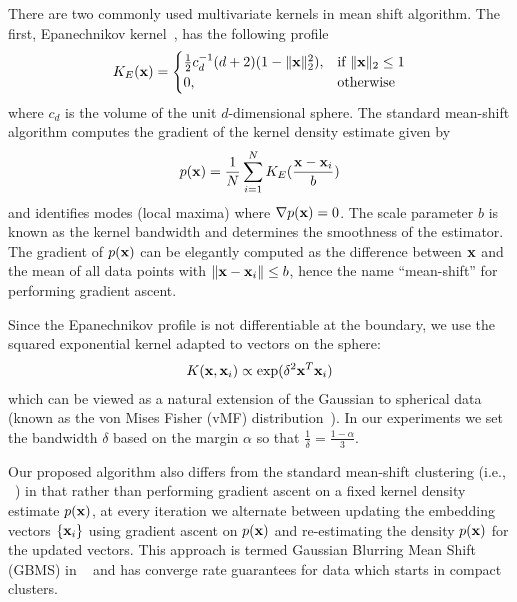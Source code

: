 \documentclass[10pt,twocolumn,letterpaper]{article}
\def\x{{\bf x}}
\begin{document}
There are two commonly used multivariate kernels in mean shift algorithm.  The
first, Epanechnikov kernel~\cite{epanechnikov1969non,cheng1995mean}, has the
following profile
\begin{equation}
K_E(\x)=
\begin{cases}
    \frac{1}{2} c_d^{-1} (d+2) (1-\Vert\x \Vert_2^2),& \text{if } \Vert\x\Vert_2\le 1\\
    0,              & \text{otherwise}
\end{cases}
\end{equation}
where $c_d$ is the volume of the unit $d$-dimensional sphere. The standard
mean-shift algorithm computes the gradient of the kernel density estimate
given by
\[
p(\x) = \frac{1}{N} \sum_{i=1}^N K_E(\frac{\x - \x_i}{b})
\]
and identifies modes (local maxima) where $\nabla p(\x)= 0$. The scale
parameter $b$ is known as the kernel bandwidth and determines the
smoothness of the estimator.  The gradient of $p(\x)$ can be elegantly computed
as the difference between $\x$ and the mean of all data points with $\Vert \x -
\x_i \Vert \leq b$, hence the name ``mean-shift'' for performing gradient
ascent.

Since the Epanechnikov profile is not differentiable at the boundary, we
use the squared exponential kernel adapted to vectors on the sphere:
\begin{equation}
\begin{split}
K(\x,\x_i) & \propto \exp( \delta^2 \x^T \x_i ) \\
\end{split}
\end{equation}
which can be viewed as a natural extension of the Gaussian to spherical data
(known as the von Mises Fisher (vMF)
distribution~\cite{fisher1953dispersion,banerjee2005clustering,mardia2009directional,kobayashi2010mises}).
In our experiments we set the bandwidth $\delta$ based on the margin $\alpha$
so that $\frac{1}{\delta}=\frac{1-\alpha}{3}$.

Our proposed algorithm also differs from the standard mean-shift clustering
(i.e., ~\cite{comaniciu1999mean}) in that rather than performing gradient
ascent on a fixed kernel density estimate $p(\x)$, at every iteration we
alternate between updating the embedding vectors $\{\x_i\}$ using gradient
ascent on $p(\x)$ and re-estimating the density $p(\x)$ for the updated
vectors.  This approach is termed Gaussian Blurring Mean Shift (GBMS) in
~\cite{carreira2008generalised} and has converge rate guarantees for
data which starts in compact clusters.
\end{document}
